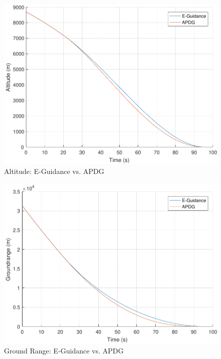 \begin{figure}[H]
	\centering
	\begin{minipage}{4.5 in}
		\includegraphics[width=\linewidth]{Figures/altEvsAPDG.pdf}
		\caption{Altitude: E-Guidance vs. APDG \label{fig:altEvsAPDG} }
	\end{minipage}
\end{figure}

\begin{figure}[H]
	\centering
	\begin{minipage}{4.5 in}
		\includegraphics[width=\linewidth]{Figures/rngEvsAPDG.pdf}
		\caption{Ground Range: E-Guidance vs. APDG \label{fig:rngEvsAPDG} }
	\end{minipage}
\end{figure}

